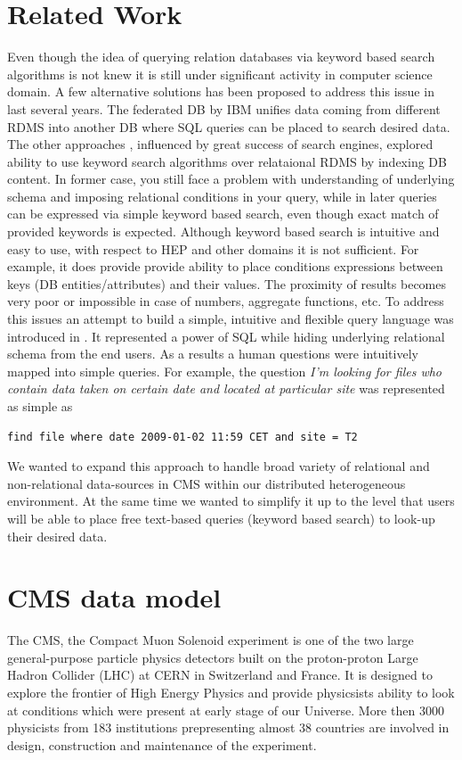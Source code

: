 \documentclass[a4paper]{jpconf}
\begin{document}
\section{Related Work\label{RelatedWork}}
Even though the idea of querying relation databases via keyword based search
algorithms is not knew it is still under significant activity in computer
science domain. A few alternative solutions has been proposed to address this issue
in last several years. The federated DB \cite{FedDB} by IBM unifies data coming 
from different RDMS into another DB where SQL queries can be placed to search desired
data. The other approaches \cite{DBXplorer, QueryAnswer}, influenced by great success
of search engines, explored ability to use keyword search algorithms over relataional RDMS
by indexing DB content. In former case, you still face a problem with understanding 
of underlying schema and imposing relational conditions in your query, while 
in later queries can be expressed via simple keyword based search, even though exact match
of provided keywords is expected. Although keyword based search is
intuitive and easy to use, with respect to HEP and other domains it is not sufficient. 
For example, it does provide provide ability to place conditions expressions between
keys (DB entities/attributes) and their values. The proximity of results becomes very poor
or impossible in case of numbers, aggregate functions, etc. To address this issues
an attempt to build a simple, intuitive and flexible query language was introduced
in \cite{DBS-QL}. It represented a power of SQL while
hiding underlying relational schema from the end users. As a results
a human questions were intuitively mapped into simple queries. For example,
the question
{\it I'm looking for files who contain data taken on certain date and located at
particular site} was represented as simple as
\begin{verbatim}
find file where date 2009-01-02 11:59 CET and site = T2
\end{verbatim}
We wanted to expand this approach to handle broad variety of relational and
non-relational data-sources in CMS within our distributed heterogeneous environment.
At the same time we wanted to simplify it up to the level that users will be
able to place free text-based queries (keyword based search) to look-up their desired data.

\section{CMS data model\label{DataModel}}
The CMS, the Compact Muon Solenoid experiment \cite{CMS} 
is one of the two large general-purpose particle physics detectors built on 
the proton-proton Large Hadron Collider (LHC) at CERN in Switzerland and France. 
It is designed to explore the frontier of High Energy Physics and provide physicsists
ability to look at conditions which were present at early stage of our Universe.
More then 3000 physicists from 183 institutions prepresenting almost 
38 countries are involved in design, construction and maintenance of the experiment.
\end{document}

